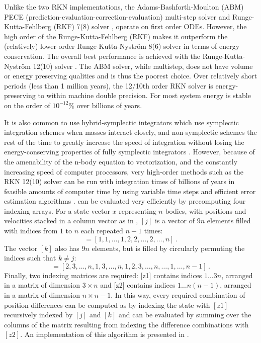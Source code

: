 Unlike the two RKN implementations, the Adams-Bashforth-Moulton (ABM) PECE (prediction-evaluation-correction-evaluation) multi-step solver \citep{shampine1975computer} and Runge-Kutta-Fehlberg (RKF) 7(8) solver \citep{fehlberg1968classical}, operate on first order ODEs.  However, the high order of the Runge-Kutta-Fehlberg (RKF) makes it outperform the (relatively) lower-order Runge-Kutta-Nystr\"{o}m 8(6) solver \citep{papakostas2000,qin1991} in terms of energy conservation.  The overall best performance is achieved with the  Runge-Kutta-Nystr\"{o}m 12(10) solver \citep{dormand1987high}.  The ABM solver, while multistep, does not have volume or energy preserving qualities and is thus the poorest  choice.  Over relatively short periods (less than 1 million years), the 12/10th order RKN solver is energy-preserving to within machine double precision.  For most system energy is stable on the order of $10^{-12}\%$ over billions of years. 

It is also common to use hybrid-symplectic integrators which use symplectic integration schemes when masses interact closely, and non-symplectic schemes the rest of the time to greatly increase the speed of integration without losing the energy-conserving properties of fully symplectic integrators \citep{chambers1999hybrid}.  However, because of the amenability of the n-body equation to vectorization, and the constantly increasing speed of computer processors, very high-order methods such as the RKN 12(10) solver can be run with integration times of billions of years in feasible amounts of computer time by using variable time steps and efficient error estimation algorithms \citep{tsitouras1999cheap}.   can be evaluated very efficiently by precomputing four indexing arrays.  For a state vector $x$ representing $n$ bodies, with positions and velocities stacked in a column vector as in , $[j]$ is a vector of $9n$ elements filled with indices from $1$ to $n$ each repeated $n-1$ times:
\begin{equation}
[j] = [1, 1, \ldots , 1, 2, 2, \ldots , 2, \ldots , n] \,.
\end{equation}
The vector $[k]$ also has $9n$ elements, but is filled by circularly permuting the indices such that $k \ne j$:
\begin{equation}
[j] = [2,3, \ldots , n, 1, 3, \ldots , n, 1, 2, 3,\ldots , n,\ldots ,1,\ldots ,n-1] \,.
\end{equation}
Finally, two indexing matrices are required: [z1] contains indices $1\ldots3n$, arranged in a matrix of dimension $3 \times n$ and [z2] contains indices $1\ldots n(n-1)$, arranged in a matrix of dimension $n \times n-1$.  In this way, every required combination of position differences can be computed as by indexing the state with $[z1]$ recursively indexed by $[j]$ and $[k]$ and  can be evaluated by summing over the columns of the matrix resulting from indexing the difference combinations with $[z2]$.  An implementation of this algorithm is presented in .

